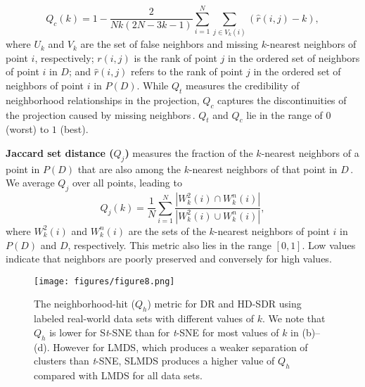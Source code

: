\documentclass[sagev,Afour,times]{sagej}
\begin{document}
\begin{equation}
    \label{Eq4}
    	Q_c(k) = 1-\frac{2}{N k(2N-3 k-1)} \sum_{i=1}^{N} \sum_{j \in V_{k} (i)} (\hat{r}(i,j)-k),
\end{equation}
where $U_k$ and $V_k$ are the set of false neighbors and missing $k$-nearest neighbors of point $i$, respectively; $r(i,j)$ is the rank of point $j$ in the ordered set of neighbors of point $i$ in $D$; and $\hat{r}(i,j)$ refers to the rank of point $j$ in the ordered set of neighbors of point $i$ in $P(D)$. While $Q_t$ measures the credibility of neighborhood relationships in the projection, $Q_c$ captures the discontinuities of the projection caused by missing neighbors\,\cite{trustworthiness_orig}. $Q_t$ and $Q_c$ lie in the range of $0$ (worst) to $1$ (best).

\noindent\textbf{Jaccard set distance ($Q_j$)} measures the fraction of the $k$-nearest neighbors of a point in $P(D)$ that are also among the $k$-nearest neighbors of that point in $D$\,\cite{jaccard_martins2015,jaccard_original}. We average $Q_j$ over all points, leading to 
\begin{equation}
    \label{Eq5}
    	Q_j(k) = \frac{1}{N} \sum_{i=1}^{N} \frac{|W_k^2(i) \cap W_k^n(i)|}{|W_k^2(i) \cup W_k^n(i)|},
\end{equation}
where $W_k^2(i)$ and $W_k^n(i)$ are the sets of the $k$-nearest neighbors of point $i$ in $P(D)$ and $D$, respectively. This metric also lies in the range $[0, 1]$. Low values indicate that neighbors are poorly preserved and conversely for high values. 
    
\begin{figure*}[hbt]
  \centering
  \texttt{[image: figures/figure8.png]}
  \parbox[t]{1\columnwidth}{\relax}
  \caption{\label{fig:8qh_realworld} The neighborhood-hit ($Q_h$) metric for DR and HD-SDR using labeled real-world data sets with different values of $k$. We note that $Q_h$ is lower for S\emph{t}-SNE than for \emph{t}-SNE for most values of $k$ in (b)--(d). However for LMDS, which produces a weaker separation of clusters than \emph{t}-SNE, SLMDS produces a higher value of $Q_h$ compared with LMDS for all data sets.}
\end{figure*}
    
\end{document}
